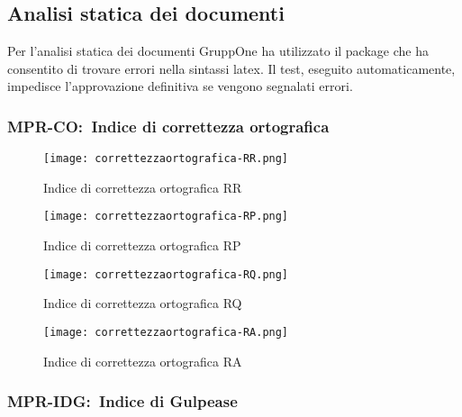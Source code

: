 \documentclass[../piano-di-qualifica.tex]{subfiles}
\begin{document}
\subsection{Analisi statica dei documenti}%
\label{sub:analisi_statica_doc}
Per l'analisi statica dei documenti GruppOne ha utilizzato il package  che ha consentito di trovare errori nella sintassi latex.
Il test, eseguito automaticamente, impedisce l'approvazione definitiva se vengono segnalati errori.

\subsubsection{MPR-CO:~Indice di correttezza ortografica}%
\label{subs:indice_corr_ortografica}

\begin{figure}[H]
  \centering
  \texttt{[image: correttezzaortografica-RR.png]}%
  \caption{Indice di correttezza ortografica \- RR}%
  \label{fig:indice_correttezza_ortografica_RR}%
\end{figure}


\begin{figure}[H]
  \centering
  \texttt{[image: correttezzaortografica-RP.png]}%
  \caption{Indice di correttezza ortografica \- RP}%
  \label{fig:indice_correttezza_ortografica_RP}%
\end{figure}

\begin{figure}[H]
  \centering
  \texttt{[image: correttezzaortografica-RQ.png]}%
  \caption{Indice di correttezza ortografica \- RQ}%
  \label{fig:indice_correttezza_ortografica_RQ}%
\end{figure}

\begin{figure}[H]
  \centering
  \texttt{[image: correttezzaortografica-RA.png]}%
  \caption{Indice di correttezza ortografica \- RA}%
  \label{fig:indice_correttezza_ortografica_RA}%
\end{figure}


\subsubsection{MPR-IDG:~Indice di Gulpease}%
\label{subs:indice_gulpease}
\end{document}
